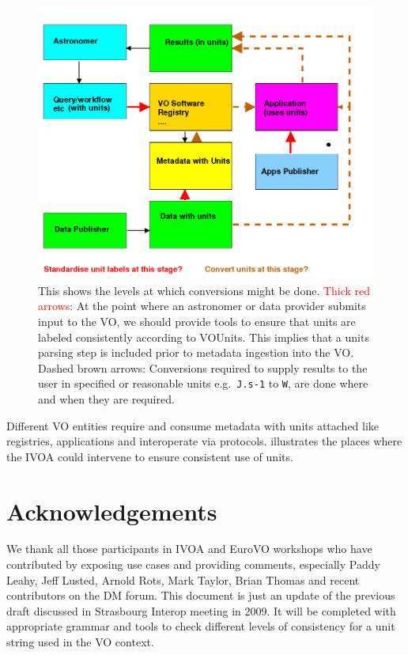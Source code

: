 \documentclass[12pt,notitlepage,onecolumn]{ivoa}
\def\eg{e.g.~}
\newcommand{\brown}{\textcolor[rgb]{0.50,0.10,0.10}}
\begin{document}
\begin{figure}[thb]
  \includegraphics[width=\textwidth]{./units2.jpg}
  \caption{This shows the levels at which conversions might be done.
\textcolor{red}{Thick red arrows}: At the point where an astronomer or
  data provider submits input to the VO, we should provide tools to
  ensure that units are labeled consistently according to VOUnits. 
  This implies that a units parsing step is included prior to metadata ingestion into the VO.
\brown{Dashed brown arrows}: Conversions required to supply results to
  the user in specified or reasonable units \eg  \texttt{J.s-1} to \texttt{W}, are done where and when they are required.}
  \label{fig:units2}
\end{figure}

Different VO entities require and consume metadata with units attached like registries, 
applications and interoperate via protocols.  illustrates the places where the IVOA
could intervene to ensure consistent use of units.



\section*{Acknowledgements}

We thank all those participants in IVOA and EuroVO workshops who have
contributed by exposing use cases and providing comments, especially Paddy Leahy, Jeff
Lusted, Arnold Rots, Mark Taylor, Brian Thomas and recent contributors
on the DM forum.
This document is just an update of the previous draft discussed in Strasbourg Interop meeting in 2009.
It will be completed with appropriate grammar and tools to check different levels of consistency for a unit string used in the VO context.
\end{document}

